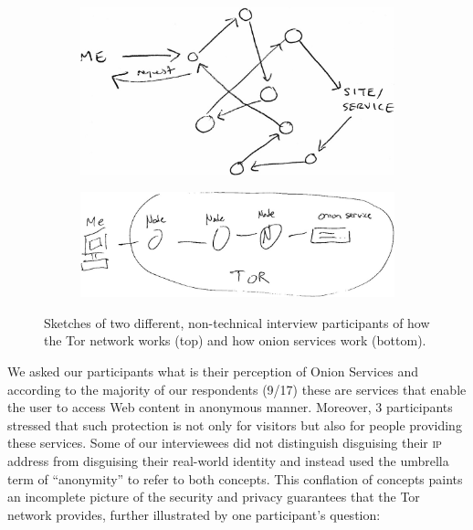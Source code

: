 \begin{figure}[t]
    \centering

    \begin{subfigure}[t]{\linewidth}
        \centering
        \includegraphics[width=0.8\linewidth]{figures/tor-sketch.jpg}
        \label{fig:tor-sketch}
    \end{subfigure}

    \begin{subfigure}[t]{\linewidth}
        \centering
        \includegraphics[width=0.8\linewidth]{figures/os-sketch.jpg}
        \label{fig:os-sketch}
    \end{subfigure}

    \caption{Sketches of two different, non-technical interview participants of
    how the Tor network works (top) and how onion services work (bottom).}
\end{figure}


We asked our participants what is their perception of Onion Services and according to the majority of our respondents (9/17) these are services that enable the user to access Web content in anonymous manner. Moreover, 3 participants stressed that such protection is not only for visitors but also for people providing these services.
Some of our interviewees did not distinguish disguising their \textsc{ip}
address from disguising their real-world identity and instead used the umbrella
term of ``anonymity'' to refer to both concepts.  This conflation of concepts
paints an incomplete picture of the security and privacy guarantees that the Tor
network provides, further illustrated by one participant's question:

